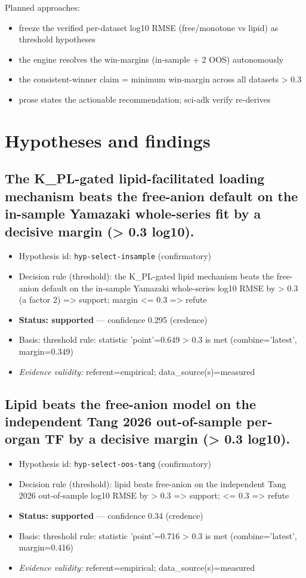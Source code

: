 \documentclass{article}
\begin{document}
Planned approaches:
\begin{itemize}
  \item freeze the verified per-dataset log10 RMSE (free/monotone vs lipid) as threshold hypotheses
  \item the engine resolves the win-margins (in-sample + 2 OOS) autonomously
  \item the consistent-winner claim = minimum win-margin across all datasets > 0.3
  \item prose states the actionable recommendation; sci-adk verify re-derives
\end{itemize}

\section{Hypotheses and findings}

\subsection{The K\_PL-gated lipid-facilitated loading mechanism beats the free-anion default on the in-sample Yamazaki whole-series fit by a decisive margin (> 0.3 log10).}
\begin{itemize}
  \item Hypothesis id: \texttt{hyp-select-insample} (confirmatory)
  \item Decision rule (threshold): the K\_PL-gated lipid mechanism beats the free-anion default on the in-sample Yamazaki whole-series log10 RMSE by > 0.3 (a factor 2) => support; margin <= 0.3 => refute
  \item \textbf{Status: supported} --- confidence 0.295 (credence)
  \item Basis: threshold rule: statistic 'point'=0.649 > 0.3 is met (combine='latest', margin=0.349)
  \item \textit{Evidence validity:} referent=empirical; data\_source(s)=measured
\end{itemize}

\subsection{Lipid beats the free-anion model on the independent Tang 2026 out-of-sample per-organ TF by a decisive margin (> 0.3 log10).}
\begin{itemize}
  \item Hypothesis id: \texttt{hyp-select-oos-tang} (confirmatory)
  \item Decision rule (threshold): lipid beats free-anion on the independent Tang 2026 out-of-sample log10 RMSE by > 0.3 => support; <= 0.3 => refute
  \item \textbf{Status: supported} --- confidence 0.34 (credence)
  \item Basis: threshold rule: statistic 'point'=0.716 > 0.3 is met (combine='latest', margin=0.416)
  \item \textit{Evidence validity:} referent=empirical; data\_source(s)=measured
\end{itemize}
\end{document}
